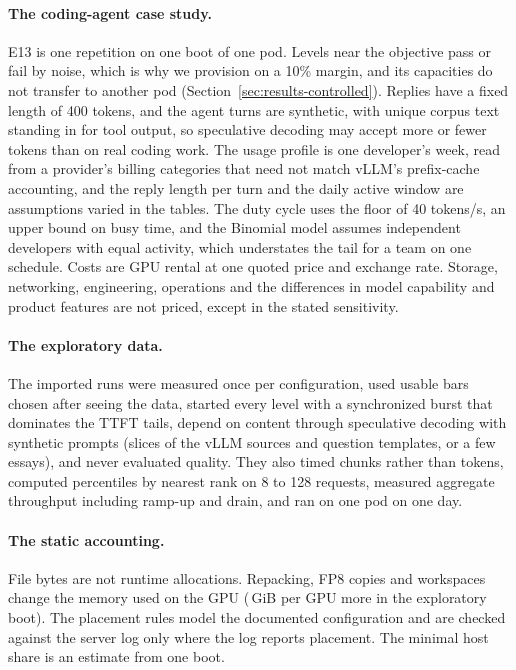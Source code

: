 \paragraph{The coding-agent case study.}
E13 is one repetition on one boot of one pod. Levels near the objective pass or fail by noise, which is why we
provision on a 10\% margin, and its capacities do not transfer to another pod (Section~\ref{sec:results-controlled}).
Replies have a fixed length of 400 tokens, and the agent turns are synthetic, with unique corpus text standing in for
tool output, so speculative decoding may accept more or fewer tokens than on real coding work. The usage profile is
one developer's week, read from a provider's billing categories that need not match vLLM's prefix-cache accounting, and
the reply length per turn and the daily active window are assumptions varied in the tables. The duty cycle uses the
floor of 40 tokens/s, an upper bound on busy time, and the Binomial model assumes independent developers with equal
activity, which understates the tail for a team on one schedule. Costs are GPU rental at one quoted price and exchange
rate. Storage, networking, engineering, operations and the differences in model capability and product features are
not priced, except in the stated sensitivity.

\paragraph{The exploratory data.}
The imported runs were measured once per configuration, used usable bars chosen after seeing the data, started every
level with a synchronized burst that dominates the TTFT tails, depend on content through speculative decoding with
synthetic prompts (slices of the vLLM sources and question templates, or a few essays), and never evaluated quality.
They also timed chunks rather than tokens, computed percentiles by nearest rank on 8 to 128 requests, measured
aggregate throughput including ramp-up and drain, and ran on one pod on one day.

\paragraph{The static accounting.}
File bytes are not runtime allocations. Repacking, FP8 copies and workspaces change the memory used on the GPU
(\,GiB per GPU more in the exploratory boot). The placement rules model the documented
configuration and are checked against the server log only where the log reports placement. The minimal host share is
an estimate from one boot.

